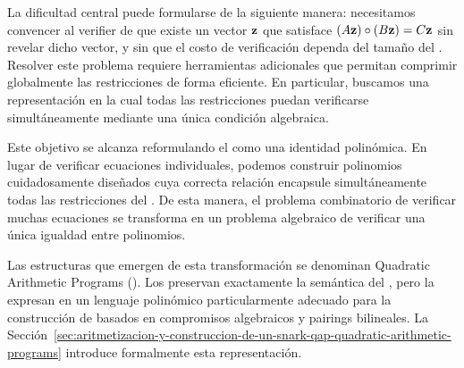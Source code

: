 La dificultad central puede formularse de la siguiente manera: necesitamos convencer al verifier de que existe un vector $\mathbf{z}$ que satisface $(A\mathbf{z}) \circ (B\mathbf{z}) = C\mathbf{z}$ sin revelar dicho vector, y sin que el costo de verificación dependa del tamaño del \ROneCS. Resolver este problema requiere herramientas adicionales que permitan comprimir globalmente las restricciones de forma eficiente. En particular, buscamos una representación en la cual todas las restricciones puedan verificarse simultáneamente mediante una única condición algebraica.

Este objetivo se alcanza reformulando el \ROneCS como una identidad polinómica. En lugar de verificar ecuaciones individuales, podemos construir polinomios cuidadosamente diseñados cuya correcta relación encapsule simultáneamente todas las restricciones del \ROneCS. De esta manera, el problema combinatorio de verificar muchas ecuaciones se transforma en un problema algebraico de verificar una única igualdad entre polinomios.

Las estructuras que emergen de esta transformación se denominan Quadratic Arithmetic Programs (\QAP). Los \QAP preservan exactamente la semántica del \ROneCS, pero la expresan en un lenguaje polinómico particularmente adecuado para la construcción de \SNARK basados en compromisos algebraicos y pairings bilineales. La Sección~\ref{sec:aritmetizacion-y-construccion-de-un-snark-qap-quadratic-arithmetic-programs} introduce formalmente esta representación.
